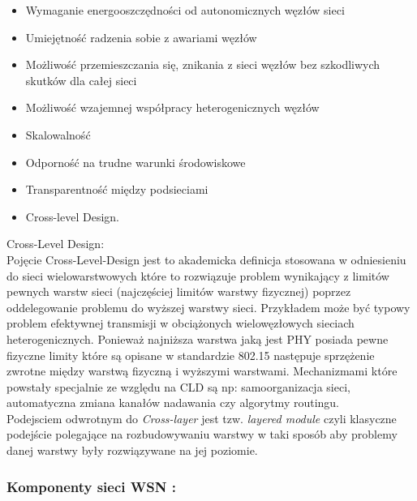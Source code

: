 \begin{itemize}
  \item Wymaganie energooszczędności od autonomicznych węzłów sieci
  \item Umiejętność radzenia sobie z awariami węzłów
  \item Możliwość przemieszczania się, znikania z sieci węzłów bez szkodliwych skutków dla całej sieci
  \item Możliwość wzajemnej współpracy heterogenicznych węzłów
  \item Skalowalność
  \item Odporność na trudne warunki środowiskowe
  \item Transparentność między podsieciami
  \item Cross-level Design.
\end{itemize}
\par Cross-Level Design: \\
Pojęcie Cross-Level-Design jest to akademicka definicja stosowana w odniesieniu do sieci wielowarstwowych które to rozwiązuje problem wynikający z limitów pewnych warstw sieci (najczęściej limitów warstwy fizycznej) poprzez oddelegowanie problemu do wyższej warstwy sieci.
Przykładem może być typowy problem efektywnej transmisji w obciążonych wielowęzłowych sieciach heterogenicznych. Ponieważ najniższa warstwa jaką jest PHY posiada pewne fizyczne limity które są opisane w standardzie 802.15 następuje sprzężenie zwrotne między warstwą fizyczną i wyższymi warstwami. Mechanizmami które powstały specjalnie ze względu na CLD są np: samoorganizacja sieci, automatyczna zmiana kanałów nadawania czy algorytmy routingu.\\
Podejsciem odwrotnym do \textit{Cross-layer} jest tzw. \textit{layered module} czyli klasyczne podejście polegające na rozbudowywaniu warstwy w taki sposób aby problemy danej warstwy były rozwiązywane na jej poziomie.
\\

\subsubsection{Komponenty sieci WSN :} 

